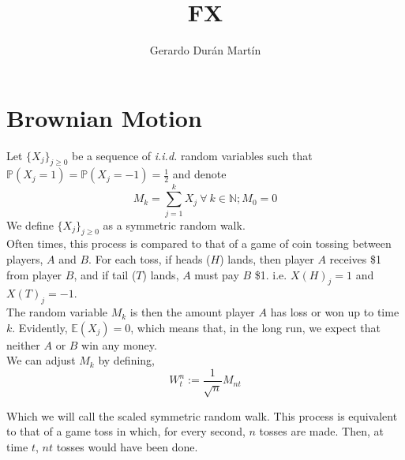 \documentclass{report}
\title{FX}
\author{Gerardo Dur\'an Mart\'in}
\begin{document}
\maketitle

\chapter{Brownian Motion}
	Let $\{X_j\}_{j\geq 0}$ be a sequence of \textit{i.i.d.} random variables such that $\mathbb{P}(X_j=1) = \mathbb{P}(X_j=-1) = \frac 1 2$ and denote
	\begin{equation}
		M_k = \sum_{j=1}^k X_j \ \forall \ k \in \mathbb N; M_0 = 0
	\end{equation}
	We define $\{X_j\}_{j\geq 0}$ as a symmetric random walk.\\
	
	Often times, this process is compared to that of a game of coin tossing between players, $A$ and $B$. For each toss, if heads ($H$) lands, then player $A$ receives \$1 from player $B$, and if tail ($T$) lands, $A$ must pay $B$ \$1. i.e. $X(H)_j = 1$ and $X(T)_j = -1$.\\
	
	The random variable $M_k$ is then the amount player $A$ has loss or won up to time $k$. Evidently, $\mathbb E(X_j) = 0$, which means that, in the long run, we expect that neither $A$ or $B$ win any money.\\
	
	We can adjust $M_k$ by defining,
	\begin{equation}
		W^{n}_t := \frac{1}{\sqrt{n}}M_{nt}
	\end{equation}
	
	Which we will call the scaled symmetric random walk. This process is equivalent to that of a game toss in which, for every second, $n$ tosses are made. Then, at time $t$, $nt$ tosses would have been done.
	
\end{document}
